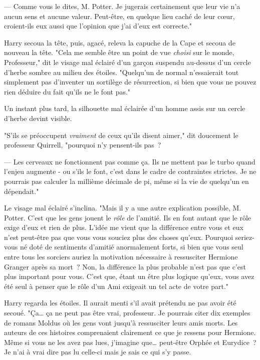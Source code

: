 --- Comme vous le dites, M. Potter. Je jugerais certainement que leur vie n'a aucun sens et aucune valeur. Peut-être, en quelque lieu caché de leur cœur, croient-ils eux aussi que l'opinion que j'ai d'eux est correcte."

Harry secoua la tête, puis, agacé, releva la capuche de la Cape et secoua de nouveau la tête. "Cela me semble être un point de vue \emph{choisi} sur le monde, Professeur," dit le visage mal éclairé d'un garçon suspendu au-dessus d'un cercle d'herbe sombre au milieu des étoiles. "Quelqu'un de normal n'essaierait tout simplement pas d'inventer un sortilège de résurrection, si bien que vous ne pouvez rien déduire du fait qu'ils ne le font pas."

Un instant plus tard, la silhouette mal éclairée d'un homme assis sur un cercle d'herbe devint visible.

"S'ils se préoccupent \emph{vraiment} de ceux qu'ils disent aimer," dit doucement le professeur Quirrell, "pourquoi n'y pensent-ils pas~?

--- Les cerveaux ne fonctionnent pas comme ça. Ils ne mettent pas le turbo quand l'enjeu augmente - ou s'ils le font, c'est dans le cadre de contraintes strictes. Je ne pourrais pas calculer la millième décimale de pi, même si la vie de quelqu'un en dépendait."

Le visage mal éclairé s'inclina. "Mais il y a une autre explication possible, M. Potter. C'est que les gens jouent le \emph{rôle} de l'amitié. Ils en font autant que le rôle exige d'eux et rien de plus. L'idée me vient que la différence entre vous et eux n'est peut-être pas que vous vous souciez plus des choses qu'eux. Pourquoi seriez-vous né doté de sentiments d'amitié anormalement forts, si bien que vous seul entre tous les sorciers auriez la motivation nécessaire à ressusciter Hermione Granger après sa mort~? Non, la différence la plus probable n'est pas que c'est plus important pour vous. C'est que, étant un être plus logique qu'eux, vous avez été seul à penser que le rôle d'un Ami exigeait un tel acte de votre part."

Harry regarda les étoiles. Il aurait menti s'il avait prétendu ne pas avoir été secoué. "Ça… ça ne peut pas être vrai, professeur. Je pourrais citer dix exemples de romans Moldus où les gens vont jusqu'à ressusciter leurs amis morts. Les auteurs de ces histoires comprenaient clairement ce que je ressens pour Hermione. Même si vous ne les avez pas lues, j'imagine que… peut-être Orphée et Eurydice~? Je n'ai à vrai dire pas lu celle-ci mais je sais ce qui s'y passe.

